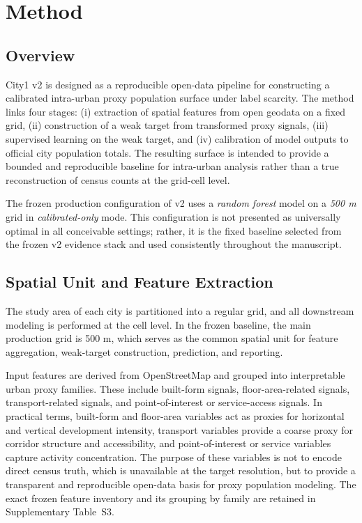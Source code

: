 \section{Method}

\subsection{Overview}

City1 v2 is designed as a reproducible open-data pipeline for constructing a calibrated intra-urban proxy population surface under label scarcity. The method links four stages: (i) extraction of spatial features from open geodata on a fixed grid, (ii) construction of a weak target from transformed proxy signals, (iii) supervised learning on the weak target, and (iv) calibration of model outputs to official city population totals. The resulting surface is intended to provide a bounded and reproducible baseline for intra-urban analysis rather than a true reconstruction of census counts at the grid-cell level.

The frozen production configuration of v2 uses a \emph{random forest} model on a \emph{500 m} grid in \emph{calibrated-only} mode. This configuration is not presented as universally optimal in all conceivable settings; rather, it is the fixed baseline selected from the frozen v2 evidence stack and used consistently throughout the manuscript.

\subsection{Spatial Unit and Feature Extraction}

The study area of each city is partitioned into a regular grid, and all downstream modeling is performed at the cell level. In the frozen baseline, the main production grid is 500 m, which serves as the common spatial unit for feature aggregation, weak-target construction, prediction, and reporting.

Input features are derived from OpenStreetMap and grouped into interpretable urban proxy families. These include built-form signals, floor-area-related signals, transport-related signals, and point-of-interest or service-access signals. In practical terms, built-form and floor-area variables act as proxies for horizontal and vertical development intensity, transport variables provide a coarse proxy for corridor structure and accessibility, and point-of-interest or service variables capture activity concentration. The purpose of these variables is not to encode direct census truth, which is unavailable at the target resolution, but to provide a transparent and reproducible open-data basis for proxy population modeling. The exact frozen feature inventory and its grouping by family are retained in Supplementary Table~S3.

